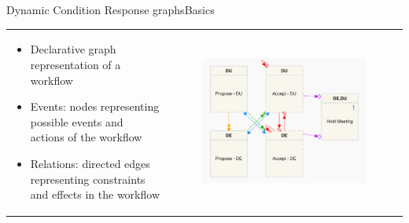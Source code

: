 \documentclass{beamer}
\begin{document}
\begin{frame}{Dynamic Condition Response graphs}{Basics}%
	\begin{tabular}{lc}
	  \parbox{0.5\linewidth}{\begin{itemize}
			\item Declarative graph representation of a workflow	
			\vfill
			\item Events: nodes representing possible events and actions of the workflow
			\vfill
			\item Relations: directed edges representing constraints and effects in the workflow
		\end{itemize}
		}
		&
	  \parbox{0.5\linewidth}{
		\begin{figure}[p]
			\includegraphics[scale=0.08]{figures/example6.png}
		\end{figure}
		}
	\end{tabular}
\end{frame}
\end{document}
